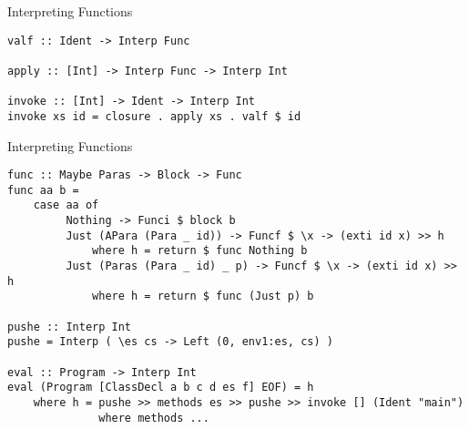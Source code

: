 \documentclass[12pt]{beamer}
\newcommand{\codesize}{\fontsize{7.7}{7.7}}
\begin{document}
\begin{spacing}{1.3}
\begin{frame}[fragile=singleslide]{Interpreting Functions}
\begin{verbatim}
valf :: Ident -> Interp Func

apply :: [Int] -> Interp Func -> Interp Int

invoke :: [Int] -> Ident -> Interp Int
invoke xs id = closure . apply xs . valf $ id
\end{verbatim}
\end{frame}

\begin{frame}[fragile=singleslide]{Interpreting Functions}
\begin{verbatim}
func :: Maybe Paras -> Block -> Func
func aa b =
    case aa of
         Nothing -> Funci $ block b
         Just (APara (Para _ id)) -> Funcf $ \x -> (exti id x) >> h
             where h = return $ func Nothing b
         Just (Paras (Para _ id) _ p) -> Funcf $ \x -> (exti id x) >> h
             where h = return $ func (Just p) b

pushe :: Interp Int
pushe = Interp ( \es cs -> Left (0, env1:es, cs) )

eval :: Program -> Interp Int
eval (Program [ClassDecl a b c d es f] EOF) = h
    where h = pushe >> methods es >> pushe >> invoke [] (Ident "main")
              where methods ...
\end{verbatim}
\end{frame}

\end{spacing}
\end{document}
